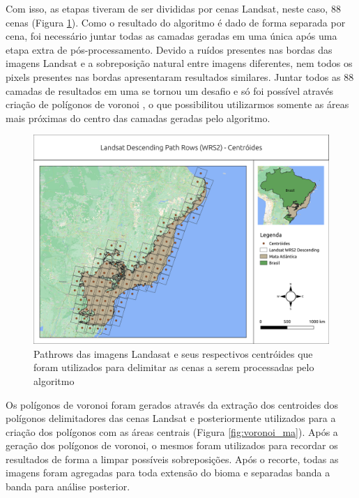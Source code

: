 \documentclass[12pt,a4paper]{article}
\begin{document}
Com isso, as etapas tiveram de ser divididas por cenas Landsat, neste caso, 88 cenas (Figura \ref{fig:pathrow_centroids}). Como o resultado do algoritmo é dado de forma separada por cena, foi necessário juntar todas as camadas geradas em uma única após uma etapa extra de pós-processamento. Devido a ruídos presentes nas bordas das imagens Landsat e a sobreposição natural entre imagens diferentes, nem todos os pixels presentes nas bordas apresentaram resultados similares. Juntar todos as 88 camadas de resultados em uma se tornou um desafio e só foi possível através criação de polígonos de voronoi \citep{Okabe}, o que possibilitou utilizarmos somente as áreas mais próximas do centro das camadas geradas pelo algoritmo. 

\begin{figure}[h!]
    \centering
    \includegraphics[scale=.5]{images/ma_pathrow_centroids.png}
    \caption{Pathrows das imagens Landasat e seus respectivos centróides que foram utilizados para delimitar as cenas a serem processadas pelo algoritmo}
    \label{fig:pathrow_centroids}
\end{figure}

Os polígonos de voronoi foram gerados através da extração dos centroides dos polígonos delimitadores das cenas Landsat e posteriormente utilizados para a criação dos polígonos com as áreas centrais (Figura \ref{fig:voronoi_ma}). Após a geração dos polígonos de voronoi, o mesmos foram utilizados para recordar os resultados de forma a limpar possíveis sobreposições. Após o recorte, todas as imagens foram agregadas para toda extensão do bioma e separadas banda a banda para análise posterior.
\end{document}
